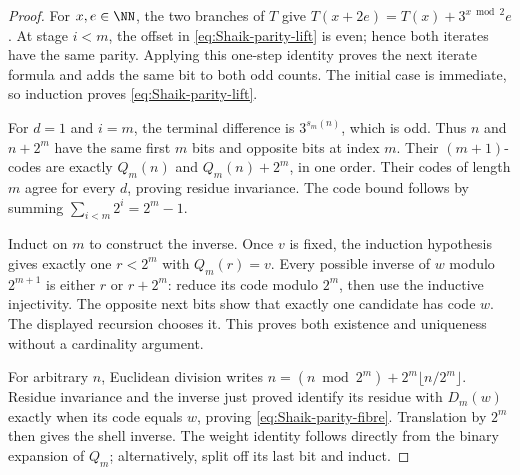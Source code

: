 \begin{proof}
For \(x,e\in\NN\), the two branches of \(T\) give
\(T(x+2e)=T(x)+3^{x\bmod2}e\).
At stage \(i<m\), the offset in
\eqref{eq:Shaik-parity-lift} is even; hence both iterates have the
same parity. Applying this one-step identity proves the next iterate
formula and adds the same bit to both odd counts. The initial case is
immediate, so induction proves \eqref{eq:Shaik-parity-lift}.

For \(d=1\) and \(i=m\), the terminal difference is \(3^{s_m(n)}\),
which is odd. Thus \(n\) and \(n+2^m\) have the same first \(m\)
bits and opposite bits at index \(m\). Their \((m+1)\)-codes are
exactly \(Q_m(n)\) and \(Q_m(n)+2^m\), in one order.
Their codes of length \(m\) agree for every \(d\), proving residue
invariance. The code bound follows by summing
\(\sum_{i<m}2^i=2^m-1\).

Induct on \(m\) to construct the inverse. Once \(v\) is fixed, the
induction hypothesis gives exactly one \(r<2^m\) with \(Q_m(r)=v\).
Every possible inverse of \(w\) modulo \(2^{m+1}\) is either \(r\)
or \(r+2^m\): reduce its code modulo \(2^m\), then use the
inductive injectivity. The opposite next bits show that exactly one
candidate has code \(w\). The displayed recursion chooses it.
This proves both existence and uniqueness without a cardinality argument.

For arbitrary \(n\), Euclidean division writes
\(n=(n\bmod2^m)+2^m\lfloor n/2^m\rfloor\).
Residue invariance and the inverse just proved identify its residue
with \(D_m(w)\) exactly when its code equals \(w\), proving
\eqref{eq:Shaik-parity-fibre}. Translation by \(2^m\) then gives the
shell inverse. The weight identity follows directly from the binary
expansion of \(Q_m\); alternatively, split off its last bit and induct.
\end{proof}

